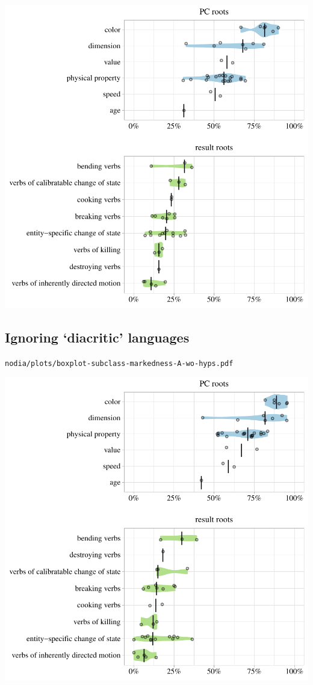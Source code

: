 \includegraphics[width=1.0\textwidth]{../nolow/plots/boxplot-subclass-markedness-A-wo-hyps.pdf}

\subsection{Ignoring `diacritic' languages}

\texttt{nodia/plots/boxplot-subclass-markedness-A-wo-hyps.pdf}

\includegraphics[width=1.0\textwidth]{../nodia/plots/boxplot-subclass-markedness-A-wo-hyps.pdf}

